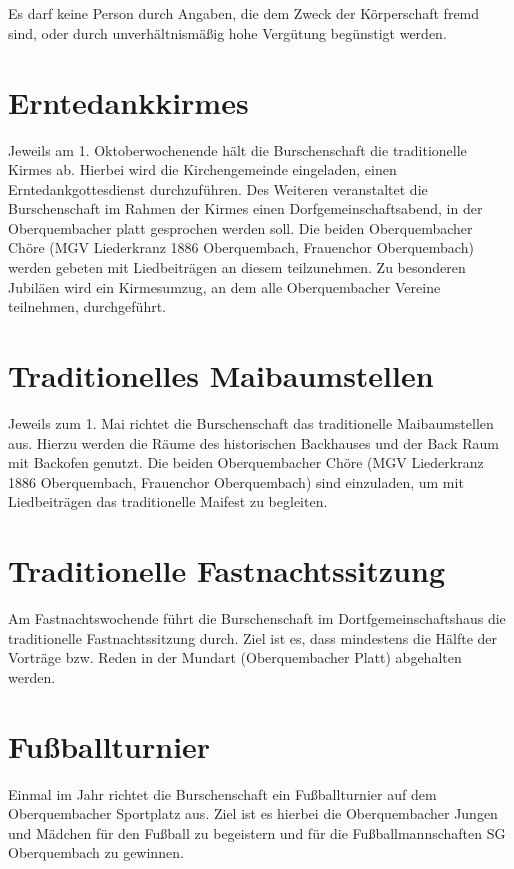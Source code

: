 \section{}
Es darf keine Person durch Angaben, die dem Zweck der Körperschaft fremd sind, oder durch unverhältnismäßig hohe Vergütung begünstigt werden.

\section{Erntedankkirmes}	
Jeweils am 1. Oktoberwochenende hält die Burschenschaft die traditionelle Kirmes ab. Hierbei wird die Kirchengemeinde eingeladen, einen Erntedankgottesdienst durchzuführen. Des Weiteren veranstaltet die Burschenschaft im Rahmen der Kirmes einen Dorfgemeinschaftsabend, in der Oberquembacher platt gesprochen werden soll. Die beiden Oberquembacher Chöre (MGV Liederkranz 1886 Oberquembach, Frauenchor Oberquembach) werden gebeten mit Liedbeiträgen an diesem teilzunehmen. Zu besonderen Jubiläen wird ein Kirmesumzug, an dem alle Oberquembacher Vereine teilnehmen, durchgeführt.

\section{Traditionelles Maibaumstellen}
Jeweils zum 1. Mai richtet die Burschenschaft das traditionelle Maibaumstellen aus. Hierzu werden die Räume des historischen Backhauses und der Back Raum mit Backofen genutzt. Die beiden Oberquembacher Chöre (MGV Liederkranz 1886 Oberquembach, Frauenchor Oberquembach) sind einzuladen, um mit Liedbeiträgen das traditionelle Maifest zu begleiten.

\section{Traditionelle Fastnachtssitzung}
Am Fastnachtswochende  führt die Burschenschaft im Dortfgemeinschaftshaus die traditionelle Fastnachtssitzung durch. Ziel ist es, dass mindestens  die Hälfte der Vorträge bzw. Reden in der Mundart (Oberquembacher Platt) abgehalten werden.

\section{Fußballturnier}
Einmal im Jahr richtet die Burschenschaft ein Fußballturnier auf dem Oberquembacher Sportplatz aus.
Ziel ist es hierbei die Oberquembacher Jungen und Mädchen für den Fußball zu begeistern und für die Fußballmannschaften SG Oberquembach zu gewinnen.

